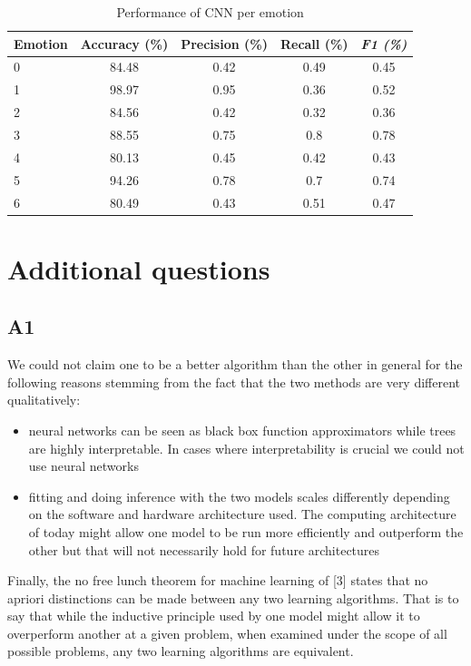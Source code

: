 \documentclass[12pt,twoside]{article}
\begin{document}
\begin{table}[!htbp]
\centering
\begin{tabular}{|l|c|c|c|c|}
\hline
\textbf{Emotion} & \multicolumn{1}{l|}{\textbf{Accuracy (\%)}} & \multicolumn{1}{l|}{\textbf{Precision (\%)}} & \multicolumn{1}{l|}{\textbf{Recall (\%)}} & \multicolumn{1}{l|}{\textit{\textbf{F1 (\%)}}} \\ \hline
0 & 84.48&  0.42&  0.49&  0.45\\ \hline
1 & 98.97&  0.95&  0.36&  0.52\\ \hline
2 & 84.56&  0.42&  0.32&  0.36\\ \hline
3 & 88.55&  0.75&  0.8 &  0.78\\ \hline
4 & 80.13&  0.45&  0.42&  0.43\\ \hline
5 & 94.26&  0.78&  0.7 &  0.74\\ \hline
6 & 80.49&  0.43&  0.51&  0.47\\ \hline
\end{tabular}
\caption{Performance of CNN per emotion}
\label{performance02}
\end{table}

       
       
\section{Additional questions}

\subsection{A1}
We could not claim one to be a better algorithm than the other in general for the following reasons stemming from the fact that the two methods are very different qualitatively:
\begin{itemize}
\item neural networks can be seen as black box function approximators while trees are highly interpretable. In cases where interpretability is crucial we could not use neural networks
\item fitting and doing inference with the two models scales differently depending on the software and hardware architecture used. The computing architecture of today might allow one model to be run more efficiently and outperform the other but that will not necessarily hold for future architectures
\end{itemize}
Finally, the no free lunch theorem for machine learning of [3] states that no apriori distinctions can be made between any two learning algorithms. That is to say that while the inductive principle used by one model might allow it to overperform another at a given problem, when examined under the scope of all possible problems, any two learning algorithms are equivalent.
\end{document}
